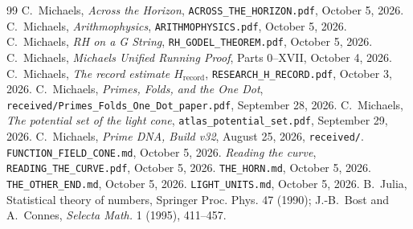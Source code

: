 \documentclass[11pt]{article}
\theoremstyle{definition}
\theoremstyle{remark}
\begin{document}
\begin{thebibliography}{99}\small
{} C.~Michaels, \emph{Across the Horizon}, \texttt{ACROSS\_THE\_HORIZON.pdf}, October 5, 2026.
 C.~Michaels, \emph{Arithmophysics}, \texttt{ARITHMOPHYSICS.pdf}, October 5, 2026.
 C.~Michaels, \emph{RH on a G String}, \texttt{RH\_GODEL\_THEOREM.pdf}, October 5, 2026.
 C.~Michaels, \emph{Michaels Unified Running Proof}, Parts 0--XVII, October 4, 2026.
 C.~Michaels, \emph{The record estimate $H_{\mathrm{record}}$}, \texttt{RESEARCH\_H\_RECORD.pdf}, October 3, 2026.
 C.~Michaels, \emph{Primes, Folds, and the One Dot}, \texttt{received/Primes\_Folds\_One\_Dot\_paper.pdf}, September 28, 2026.
 C.~Michaels, \emph{The potential set of the light cone}, \texttt{atlas\_potential\_set.pdf}, September 29, 2026.
 C.~Michaels, \emph{Prime DNA, Build v32}, August 25, 2026, \texttt{received/}.
 \texttt{FUNCTION\_FIELD\_CONE.md}, October 5, 2026.
 \emph{Reading the curve}, \texttt{READING\_THE\_CURVE.pdf}, October 5, 2026.
 \texttt{THE\_HORN.md}, October 5, 2026.
 \texttt{THE\_OTHER\_END.md}, October 5, 2026.
 \texttt{LIGHT\_UNITS.md}, October 5, 2026.
 B.~Julia, Statistical theory of numbers, Springer Proc. Phys. 47 (1990); J.-B.~Bost and A.~Connes, \emph{Selecta Math.} 1 (1995), 411--457.
\end{thebibliography}
\end{document}
